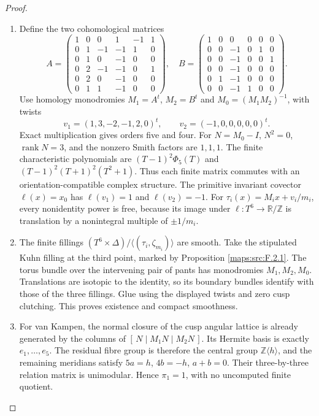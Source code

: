 \documentclass[11pt,a4paper]{article}
\theoremstyle{definition}
\begin{document}
\begin{proof}
\begin{enumerate}[label=\arabic*.]
\item Define the two cohomological matrices
\[
A=\begin{pmatrix}
1&0&0&1&-1&1\\0&1&-1&-1&1&0\\0&1&0&-1&0&0\\
0&2&-1&-1&0&1\\0&2&0&-1&0&0\\0&1&1&-1&0&0
\end{pmatrix},\quad
B=\begin{pmatrix}
1&0&0&0&0&0\\0&0&-1&0&1&0\\0&0&-1&0&0&1\\
0&0&-1&0&0&0\\0&1&-1&0&0&0\\0&0&-1&1&0&0
\end{pmatrix}.
\]
Use homology monodromies $M_1=A^t$, $M_2=B^t$ and
$M_0=(M_1M_2)^{-1}$, with twists
\[
 v_1=(1,3,-2,-1,2,0)^t,\qquad v_2=(-1,0,0,0,0,0)^t .
\]
Exact multiplication gives orders five and four.  For $N=M_0-I$,
$N^2=0$, $\operatorname{rank}N=3$, and the nonzero Smith factors
are $1,1,1$.  The finite characteristic polynomials are
$(T-1)^2\Phi_5(T)$ and $(T-1)^2(T+1)^2(T^2+1)$.
Thus each finite matrix commutes with an orientation-compatible
complex structure.  The primitive invariant covector
$\ell(x)=x_0$ has $\ell(v_1)=1$ and $\ell(v_2)=-1$.
For $\tau_i(x)=M_ix+v_i/m_i$, every nonidentity power is free,
because its image under $\ell:T^6\to\mathbb R/\mathbb Z$ is
translation by a nonintegral multiple of $\pm1/m_i$.

\item The finite fillings
$(T^6\times\Delta)/\langle(\tau_i,\zeta_{m_i})\rangle$ are smooth.
Take the stipulated Kuhn filling at the third point, marked by
Proposition \ref{maps:src:F.2.1}.  The torus bundle over the intervening pair of
pants has monodromies $M_1,M_2,M_0$.  Translations are isotopic to
the identity, so its boundary bundles identify with those of the
three fillings.  Glue using the displayed twists and zero cusp
clutching.  This proves existence and compact smoothness.

\item For van Kampen, the normal closure of the cusp angular lattice is
already generated by the columns of
$[\,N\mid M_1N\mid M_2N\,]$.
Its Hermite basis is exactly $e_1,\ldots,e_5$.  The residual fibre
group is therefore the central group $\mathbb Z\langle h\rangle$,
and the remaining meridians satisfy
$5a=h$, $4b=-h$, $a+b=0$.
Their three-by-three relation matrix is unimodular.  Hence
$\pi_1=1$, with no uncomputed finite quotient.


\end{enumerate}
\end{proof}
\end{document}
